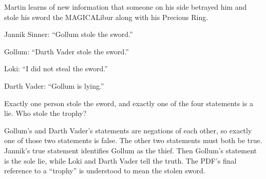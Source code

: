 Martin learns of new information that someone on his side betrayed him and stole his sword the MAGICALibur along with his Precious Ring.

Jannik Sinner: ``Gollum stole the sword.''

Gollum: ``Darth Vader stole the sword.''

Loki: ``I did not steal the sword.''

Darth Vader: ``Gollum is lying.''

Exactly one person stole the sword, and exactly one of the four statements is a lie. Who stole the trophy?

\begin{solution}
Gollum's and Darth Vader's statements are negations of each other, so
exactly one of those two statements is false. The other two statements
must both be true. Jannik's true statement identifies
$\boxed{\text{Gollum}}$ as the thief. Then Gollum's statement is the sole
lie, while Loki and Darth Vader tell the truth.
The PDF's final reference to a ``trophy'' is understood to mean the stolen sword.
\end{solution}
